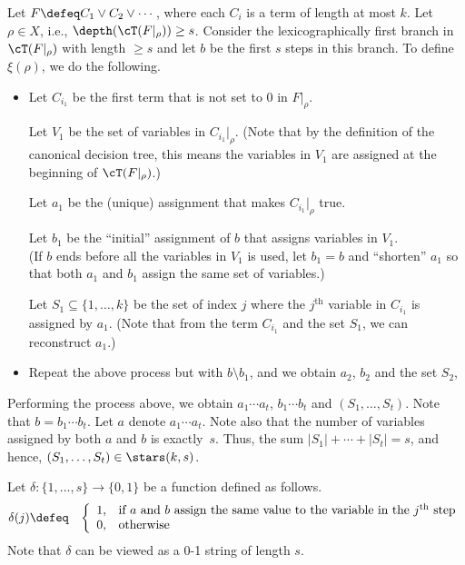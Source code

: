 \documentclass[11pt, a4paper]{article}
\begin{document}
Let $F\defeq C_1\vee C_2\vee \cdots$, where each $C_i$ is a term of length at most $k$.
Let $\rho \in X$, i.e., $\depth(\cT(F|_{\rho}))\geq s$.
Consider the lexicographically first branch in $\cT(F|_{\rho})$ with length $\geq s$
and let $b$ be the first $s$ steps in this branch.
To define $\xi(\rho)$, we do the following.
\begin{itemize}
\item
Let $C_{i_1}$ be the first term that is not set to 0 in $F|_{\rho}$.

Let $V_1$ be the set of variables in $C_{i_1}|_{\rho}$.
(Note that by the definition of the canonical decision tree, 
this means the variables in $V_1$ are assigned at the beginning of $\cT(F|_{\rho})$.)

Let $a_1$ be the (unique) assignment that makes $C_{i_1}|_{\rho}$ true. 

Let $b_1$ be the ``initial'' assignment of $b$ that assigns variables in $V_1$.
\\
(If $b$ ends before all the variables in $V_1$ is used, let $b_1=b$
and ``shorten'' $a_1$ so that both $a_1$ and $b_1$ assign the same set of variables.)

Let $S_1\subseteq \{1,\ldots,k\}$ be the set of index $j$ where the $j^{\text{th}}$ variable in $C_{i_1}$
is assigned by $a_1$.
(Note that from the term $C_{i_1}$ and the set $S_1$, we can reconstruct $a_1$.)

\item
Repeat the above process but with $b\setminus b_1$, and we obtain $a_2$, $b_2$ and the set $S_2$,
\end{itemize}
Performing the process above, we obtain $a_1\cdots a_t$, $b_1\cdots b_t$ and $(S_1,\ldots,S_t)$.
Note that $b=b_1\cdots b_t$.
Let $a$ denote $a_1\cdots a_t$.
Note also that the number of variables assigned by both $a$ and $b$ is exactly~$s$.
Thus, the sum $|S_1|+\cdots+|S_t|=s$, and hence, $(S_1,\ldots,S_t)\in \stars(k,s)$.

Let $\delta : \{1,\ldots,s\}\to \{0,1\}$ be a function defined as follows.
\begin{eqnarray*}
\delta(j) & \defeq & 
\left\{
\begin{array}{ll}
1, & \text{if $a$ and $b$ assign the same value to the variable in the $j^{\text{th}}$ step}
\\
0, & \text{otherwise}
\end{array}
\right.
\end{eqnarray*}
Note that $\delta$ can be viewed as a 0-1 string of length $s$.
\end{document}
